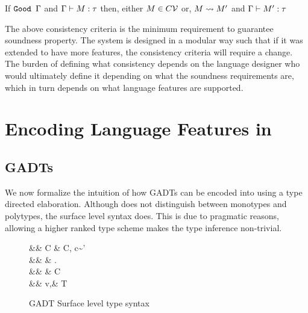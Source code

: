 \documentclass[manuscript,screen,nonacm]{acmart}
\begin{document}
\begin{theorem}\label{thm:progress-sfc}
 If $\texttt{Good~}\Gamma$ and $\Gamma \vdash M : \tau$ then, either $M \in C\mathcal{V}$ or, $M \rightsquigarrow M'$ and
 $\Gamma \vdash M' : \tau$
\end{theorem}

The above consistency criteria is the minimum requirement to guarantee soundness property. The system is designed in a modular way such that if it was extended to have more features, the consistency criteria will require a change. The burden of defining what consistency depends on the language designer who would ultimately define it depending on what the soundness requirements are, which in turn depends on what language features are supported.

\section{Encoding Language Features in \SFC}\label{sec:sfc-encoding-features}%
\subsection{GADTs}\label{sec:fc-encodes-gadts}
We now formalize the intuition of how GADTs can be encoded into \SFC using a type directed elaboration. Although \SFC does not distinguish between monotypes and polytypes, the surface level syntax does. This is due to pragmatic reasons, allowing a higher ranked type scheme makes the type inference non-trivial\cite{jones_practical_2007}.

\begin{figure}[ht]
 \centering
 \begin{syntax}
  && C \bnfeq& \empt \bnfor C, c\co\tau\sim\tau'\\
  && \pi \bnfeq& \eta \bnfor \Forall\TyVar.\pi\\
  && \eta \bnfeq& \tau \bnfor C \then \eta\\
  && v,\tau \bnfeq& \TyVar \bnfor \tau\to\tau \bnfor T\App\many\tau
 \end{syntax}
 \caption{GADT Surface level type syntax}
 \label{fig:gadt-type-syntax}
\end{figure}
\end{document}
